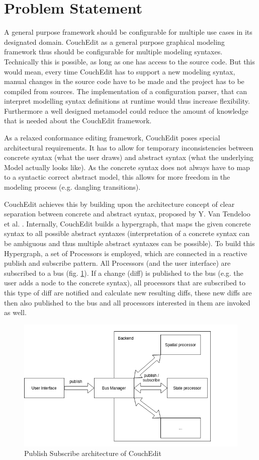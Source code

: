 \section{Problem Statement}

A general purpose framework should be configurable for multiple use cases in its designated domain. CouchEdit as a general purpose graphical modeling framework thus should be configurable for multiple modeling syntaxes. Technically this is possible, as long as one has access to the source code. But this would mean, every time CouchEdit has to support a new modeling syntax, manual changes in the source code have to be made and the project has to be compiled from sources. The implementation of a configuration parser, that can interpret modelling syntax definitions at runtime would thus increase flexibility. Furthermore a well designed metamodel could reduce the amount of knowledge that is needed about the CouchEdit framework.

As a relaxed conformance editing framework, CouchEdit poses special architectural requirements. It has to allow for temporary inconsistencies between concrete syntax (what the user draws) and abstract syntax (what the underlying Model actually looks like). As the concrete syntax does not always have to map to a syntactic correct abstract model, this allows for more freedom in the modeling process (e.g. dangling transitions).

CouchEdit achieves this by building upon the architecture concept of clear separation between concrete and abstract syntax, proposed by Y. Van Tendeloo et al. \cite{van_tendeloo_concrete_2017}. Internally, CouchEdit builds a hypergraph, that maps the given concrete syntax to all possible abstract syntaxes (interpretation of a concrete syntax can be ambiguous and thus multiple abstract syntaxes can be possible). To build this Hypergraph, a set of Processors is employed, which are connected in a reactive publish and subscribe pattern. All Processors (and the user interface) are subscribed to a bus (fig. \ref{fig:processors}). If a change (diff) is published to the bus (e.g. the user adds a node to the concrete syntax), all processors that are subscribed to this type of diff are notified and calculate new resulting diffs, these new diffs are then also published to the bus and all processors interested in them are invoked as well.

\begin{figure}
  \centering
  \includegraphics[width=.6\linewidth]{images/couchedit-processors}
  \caption{Publish Subscribe architecture of CouchEdit}
  \label{fig:processors}
\end{figure}

